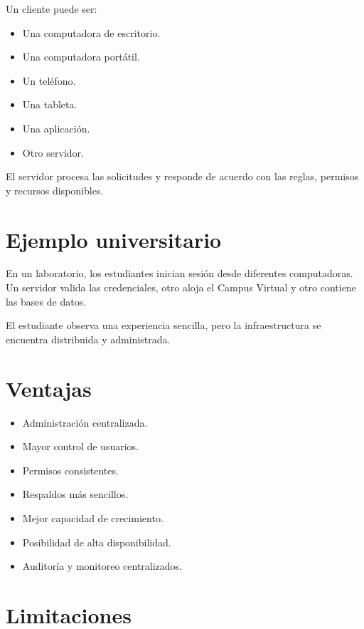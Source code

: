 \documentclass[
  spanish,
  letterpaper,
]{scrbook}
\providecommand{\tightlist}{%
  \setlength{\itemsep}{0pt}\setlength{\parskip}{0pt}}
\begin{document}
Un cliente puede ser:

\begin{itemize}
\tightlist
\item
  Una computadora de escritorio.
\item
  Una computadora portátil.
\item
  Un teléfono.
\item
  Una tableta.
\item
  Una aplicación.
\item
  Otro servidor.
\end{itemize}

El servidor procesa las solicitudes y responde de acuerdo con las
reglas, permisos y recursos disponibles.

\section{Ejemplo universitario}\label{ejemplo-universitario}

En un laboratorio, los estudiantes inician sesión desde diferentes
computadoras. Un servidor valida las credenciales, otro aloja el Campus
Virtual y otro contiene las bases de datos.

El estudiante observa una experiencia sencilla, pero la infraestructura
se encuentra distribuida y administrada.

\section{Ventajas}\label{ventajas-1}

\begin{itemize}
\tightlist
\item
  Administración centralizada.
\item
  Mayor control de usuarios.
\item
  Permisos consistentes.
\item
  Respaldos más sencillos.
\item
  Mejor capacidad de crecimiento.
\item
  Posibilidad de alta disponibilidad.
\item
  Auditoría y monitoreo centralizados.
\end{itemize}

\section{Limitaciones}\label{limitaciones-1}
\end{document}
